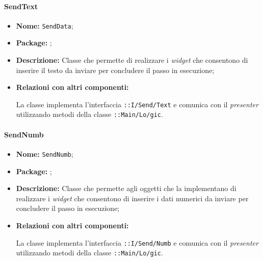 \paragraph{SendText}
\begin{flushleft}
\begin{itemize}
\item \textbf{Nome:} \texttt{SendData};
\item \textbf{Package:} \texttt{\viewAdmin{}};
\item \textbf{Descrizione:} Classe che permette di realizzare i \textit{widget} che consentono di inserire il testo da inviare per concludere il passo in esecuzione;
\item \textbf{Relazioni con altri componenti:}
\begin{sloppypar}
La classe implementa l'interfaccia \texttt{\iViewUser{}::I\fshyp{}Send\fshyp{}Text} e comunica con il \textit{presenter} utilizzando metodi della classe \texttt{\logicUser{}::Main\fshyp{}Lo\fshyp{}gic}.
\end{sloppypar}
\end{itemize}
\end{flushleft}

\paragraph{SendNumb}
\begin{flushleft}
\begin{itemize}
\item \textbf{Nome:} \texttt{SendNumb};
\item \textbf{Package:} \texttt{\viewAdmin{}};
\item \textbf{Descrizione:} Classe che permette agli oggetti che la implementano di realizzare i \textit{widget} che consentono di inserire i dati numerici da inviare per concludere il passo in esecuzione;
\item \textbf{Relazioni con altri componenti:}
\begin{sloppypar}
La classe implementa l'interfaccia \texttt{\iViewUser{}::I\fshyp{}Send\fshyp{}Numb} e comunica con il \textit{presenter} utilizzando metodi della classe \texttt{\logicUser{}::Main\fshyp{}Lo\fshyp{}gic}.
\end{sloppypar}
\end{itemize}
\end{flushleft}


